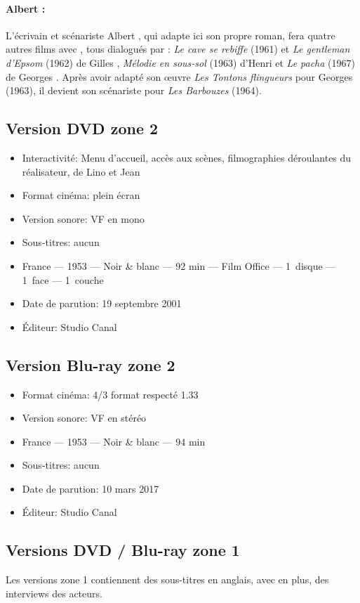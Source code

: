 \paragraph{Albert :} L'écrivain et scénariste Albert , qui adapte ici son propre roman, fera quatre autres films avec , tous dialogués par : \emph{Le cave se rebiffe} (1961) et \emph{Le gentleman d'Epsom} (1962) de Gilles , \emph{Mélodie en sous-sol} (1963) d'Henri  et \emph{Le pacha} (1967) de Georges . Après avoir adapté son \oe uvre \emph{Les Tontons flingueurs} pour Georges  (1963), il devient son scénariste pour \emph{Les Barbouzes} (1964).


\subsection*{Version DVD zone 2}

\begin{itemize}
	\item Interactivité: Menu d'accueil, accès aux scènes, filmographies déroulantes du réalisateur, de Lino  et Jean 
	\item Format cinéma: plein écran
	\item Version sonore: VF en mono
	\item Sous-titres: aucun
	\item France --- 1953 --- Noir \& blanc --- 92 min --- Film Office --- 1~disque --- 1~face --- 1~couche
	\item Date de parution: 19 septembre 2001
	\item Éditeur: Studio Canal
\end{itemize}

\subsection*{Version Blu-ray zone 2}

\begin{itemize}
	\item Format cinéma: 4/3 format respecté 1.33
	\item Version sonore: VF en stéréo
	\item France --- 1953 --- Noir \& blanc --- 94 min
	\item Sous-titres: aucun
	\item Date de parution: 10 mars 2017
	\item Éditeur: Studio Canal
\end{itemize}

\subsection*{Versions DVD / Blu-ray zone 1}

Les versions zone 1 contiennent des sous-titres en anglais, avec en plus, des interviews des acteurs.
